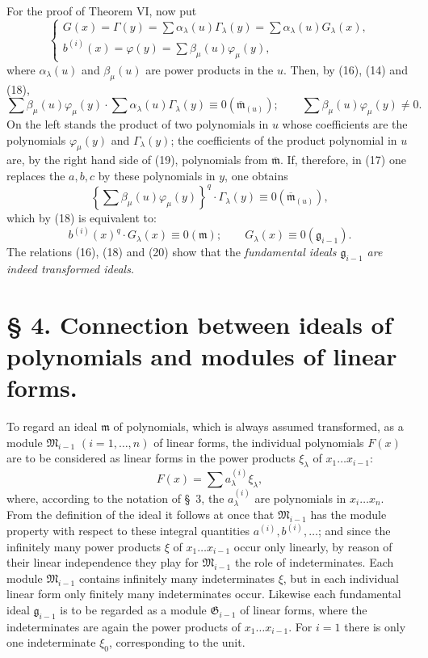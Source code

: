 \documentclass[11pt]{article}
\providecommand{\Gmod}{\mathfrak G}
\providecommand{\mideal}{\mathfrak m}
\providecommand{\gideal}{\mathfrak g}
\providecommand{\zero}[1]{\equiv 0(#1)}
\providecommand{\Gmod}{\mathfrak G}
\providecommand{\Mmod}{\mathfrak M}
\providecommand{\mideal}{\mathfrak m}
\providecommand{\gideal}{\mathfrak g}
\providecommand{\zero}[1]{\equiv 0\pmod{#1}}
\begin{document}
For the proof of Theorem VI, now put
\begin{equation}
\begin{cases}
 G(x)=\Gamma(y)=\sum \alpha_\lambda(u)\Gamma_\lambda(y)=\sum \alpha_\lambda(u)G_\lambda(x),\\
 b^{(i)}(x)=\varphi(y)=\sum \beta_\mu(u)\varphi_\mu(y),
\end{cases}
\tag{18}
\end{equation}
where $\alpha_\lambda(u)$ and $\beta_\mu(u)$ are power products in the $u$. Then, by (16), (14) and (18),
\begin{equation}
 \sum\beta_\mu(u)\varphi_\mu(y)\cdot
 \sum\alpha_\lambda(u)\Gamma_\lambda(y)\zero{\overline{\mideal}_{(u)}};
 \qquad
 \sum\beta_\mu(u)\varphi_\mu(y)\ne0.
\tag{19}
\end{equation}
On the left stands the product of two polynomials in $u$ whose coefficients are the polynomials $\varphi_\mu(y)$ and $\Gamma_\lambda(y)$; the coefficients of the product polynomial in $u$ are, by the right hand side of (19), polynomials from $\overline{\mideal}$. If, therefore, in (17) one replaces the $a,b,c$ by these polynomials in $y$, one obtains
\[
 \left\{\sum\beta_\mu(u)\varphi_\mu(y)\right\}^q\cdot \Gamma_\lambda(y)\zero{\overline{\mideal}_{(u)}},
\]
which by (18) is equivalent to:
\begin{equation}
 b^{(i)}(x)^q\cdot G_\lambda(x)\zero{\mideal};
 \qquad
 G_\lambda(x)\zero{\gideal_{i-1}}.
\tag{20}
\end{equation}
The relations (16), (18) and (20) show that the \emph{fundamental ideals $\gideal_{i-1}$ are indeed transformed ideals.}




\section*{§ 4. Connection between ideals of polynomials and modules of linear forms.}

To regard an ideal $\mideal$ of polynomials, which is always assumed transformed, as a module $\Mmod_{i-1}$ $(i=1,
\ldots,n)$ of linear forms, the individual polynomials $F(x)$ are to be considered as linear forms in the power products $\xi_\lambda$ of $x_1\ldots x_{i-1}$:
\[
 F(x)=\sum a^{(i)}_\lambda\xi_\lambda,
\]
where, according to the notation of §~3, the $a^{(i)}_\lambda$ are polynomials in $x_i\ldots x_n$. From the definition of the ideal it follows at once that $\Mmod_{i-1}$ has the module property with respect to these integral quantities $a^{(i)},b^{(i)},\ldots$; and since the infinitely many power products $\xi$ of $x_1\ldots x_{i-1}$ occur only linearly, by reason of their linear independence they play for $\Mmod_{i-1}$ the role of indeterminates. Each module $\Mmod_{i-1}$ contains infinitely many indeterminates $\xi$, but in each individual linear form only finitely many indeterminates occur. Likewise each fundamental ideal $\gideal_{i-1}$ is to be regarded as a module $\Gmod_{i-1}$ of linear forms, where the indeterminates are again the power products of $x_1\ldots x_{i-1}$. For $i=1$ there is only one indeterminate $\xi_0$, corresponding to the unit.
\end{document}
